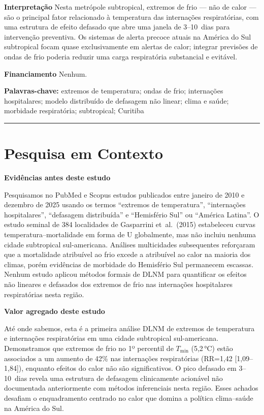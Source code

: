 \documentclass[12pt]{article}
\begin{document}
\textbf{Interpretação}\quad
Nesta metrópole subtropical, extremos de frio --- não de calor ---
são o principal fator relacionado à temperatura das internações
respiratórias, com uma estrutura de efeito defasado que abre uma
janela de 3--10~dias para intervenção preventiva. Os sistemas de
alerta precoce atuais na América do Sul subtropical focam quase
exclusivamente em alertas de calor; integrar previsões de ondas
de frio poderia reduzir uma carga respiratória substancial e
evitável.

\textbf{Financiamento}\quad
Nenhum.

\bigskip

\textbf{Palavras-chave:} extremos de temperatura; ondas de frio;
internações hospitalares; modelo distribuído de defasagem não linear;
clima e saúde; morbidade respiratória; subtropical; Curitiba

\bigskip
\hrule
\bigskip


\section*{Pesquisa em Contexto}

\textbf{Evidências antes deste estudo}

Pesquisamos no PubMed e Scopus estudos publicados entre janeiro de
2010 e dezembro de 2025 usando os termos ``extremos de temperatura'',
``internações hospitalares'', ``defasagem distribuída'' e ``Hemisfério
Sul'' ou ``América Latina''. O estudo seminal de 384 localidades de
Gasparrini et~al.\ (2015) estabeleceu curvas temperatura--mortalidade
em forma de U globalmente, mas não incluiu nenhuma cidade subtropical
sul-americana. Análises multicidades subsequentes reforçaram que a
mortalidade atribuível ao frio excede a atribuível ao calor na maioria
dos climas, porém evidências de morbidade do Hemisfério Sul permanecem
escassas. Nenhum estudo aplicou métodos formais de DLNM para
quantificar os efeitos não lineares e defasados dos extremos de frio
nas internações hospitalares respiratórias nesta região.

\textbf{Valor agregado deste estudo}

Até onde sabemos, esta é a primeira análise DLNM de extremos de
temperatura e internações respiratórias em uma cidade subtropical
sul-americana. Demonstramos que extremos de frio no 1º percentil de
$T_\mathrm{min}$ (5,2\,°C) estão associados a um aumento de 42\%
nas internações respiratórias (RR=1,42 [1,09--1,84]), enquanto
efeitos do calor não são significativos. O pico defasado em 3--10~dias
revela uma estrutura de defasagem clinicamente acionável não
documentada anteriormente com métodos inferenciais nesta região. Esses
achados desafiam o enquadramento centrado no calor que domina a
política clima--saúde na América do Sul.
\end{document}
